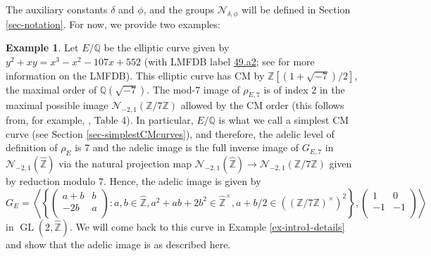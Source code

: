 \documentclass[11pt]{amsart}
\theoremstyle{definition}
\newtheorem{example}[defn]{Example}
\newcommand{\Q}{\mathbb{Q}}
\newcommand{\Z}{\mathbb{Z}}
\newcommand{\GL}{\operatorname{GL}}
\begin{document}
The auxiliary constants $\delta$ and $\phi$, and the groups $\mathcal{N}_{\delta,\phi}$ will be defined in Section \ref{sec-notation}. For now, we provide two examples:
\begin{example}\label{ex-intro1}
    Let $E/\Q$ be the elliptic curve given by $y^2+xy=x^3-x^2-107x+552$ (with LMFDB label \href{https://www.lmfdb.org/EllipticCurve/Q/49/a/2}{49.a2}; see \cite{lmfdb} for more information on the LMFDB). This elliptic curve has CM by $\Z[(1+\sqrt{-7})/2]$, the maximal order of $\Q(\sqrt{-7})$. The mod-$7$ image of $\rho_{E,7}$ is of index $2$
 in the maximal possible image $\mathcal{N}_{-2,1}(\Z/7\Z)$ allowed by the CM order (this follows from, for example, \cite{modelspaper}, Table 4). In particular, $E/\Q$ is what we call a simplest CM curve (see Section \ref{sec-simplestCMcurves}), and therefore, the adelic level of definition of $\rho_E$ is $7$ and the adelic image is the full inverse image of $G_{E,7}$ in $\mathcal{N}_{-2,1}(\widehat{\Z})$ via the natural projection map  $\mathcal{N}_{-2,1}(\widehat{\Z})\to \mathcal{N}_{-2,1}(\Z/7\Z)$ given by reduction modulo $7$. Hence, the adelic image is given by
 $$G_{E}=\left\langle \left\{ \left(\begin{array}{cc} a+b & b\\ -2b & a \\\end{array}\right) : a,b \in \widehat{\Z}, a^2+ab+2b^2 \in \widehat{\Z}^\times, a+b/2 \in ((\Z/7\Z)^\times)^2\right\}, \left(\begin{array}{cc} 1 & 0\\ -1 & -1 \\\end{array}\right)\right\rangle$$
 in $\GL(2,\widehat{\Z})$. We will come back to this curve in Example \ref{ex-intro1-details} and show that the adelic image is as described here.
 \end{example}
\end{document}

